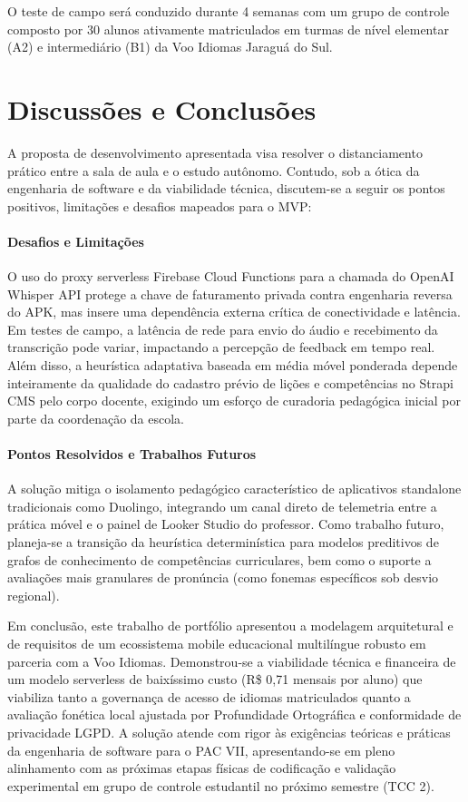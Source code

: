 \documentclass[portuguese]{sbcreviews-2025}%
\begin{document}
O teste de campo será conduzido durante 4 semanas com um grupo de controle composto por 30 alunos ativamente matriculados em turmas de nível elementar (A2) e intermediário (B1) da Voo Idiomas Jaraguá do Sul.

\section{Discussões e Conclusões}
\label{sec:discconclusao}

A proposta de desenvolvimento apresentada visa resolver o distanciamento prático entre a sala de aula e o estudo autônomo. Contudo, sob a ótica da engenharia de software e da viabilidade técnica, discutem-se a seguir os pontos positivos, limitações e desafios mapeados para o MVP:

\paragraph{Desafios e Limitações} O uso do proxy serverless Firebase Cloud Functions para a chamada do OpenAI Whisper API protege a chave de faturamento privada contra engenharia reversa do APK, mas insere uma dependência externa crítica de conectividade e latência. Em testes de campo, a latência de rede para envio do áudio e recebimento da transcrição pode variar, impactando a percepção de feedback em tempo real. Além disso, a heurística adaptativa baseada em média móvel ponderada depende inteiramente da qualidade do cadastro prévio de lições e competências no Strapi CMS pelo corpo docente, exigindo um esforço de curadoria pedagógica inicial por parte da coordenação da escola.

\paragraph{Pontos Resolvidos e Trabalhos Futuros} A solução mitiga o isolamento pedagógico característico de aplicativos standalone tradicionais como Duolingo, integrando um canal direto de telemetria entre a prática móvel e o painel de Looker Studio do professor. Como trabalho futuro, planeja-se a transição da heurística determinística para modelos preditivos de grafos de conhecimento de competências curriculares, bem como o suporte a avaliações mais granulares de pronúncia (como fonemas específicos sob desvio regional).

Em conclusão, este trabalho de portfólio apresentou a modelagem arquitetural e de requisitos de um ecossistema mobile educacional multilíngue robusto em parceria com a Voo Idiomas. Demonstrou-se a viabilidade técnica e financeira de um modelo serverless de baixíssimo custo (R\$ 0,71 mensais por aluno) que viabiliza tanto a governança de acesso de idiomas matriculados quanto a avaliação fonética local ajustada por Profundidade Ortográfica e conformidade de privacidade LGPD. A solução atende com rigor às exigências teóricas e práticas da engenharia de software para o PAC VII, apresentando-se em pleno alinhamento com as próximas etapas físicas de codificação e validação experimental em grupo de controle estudantil no próximo semestre (TCC 2).
\end{document}
